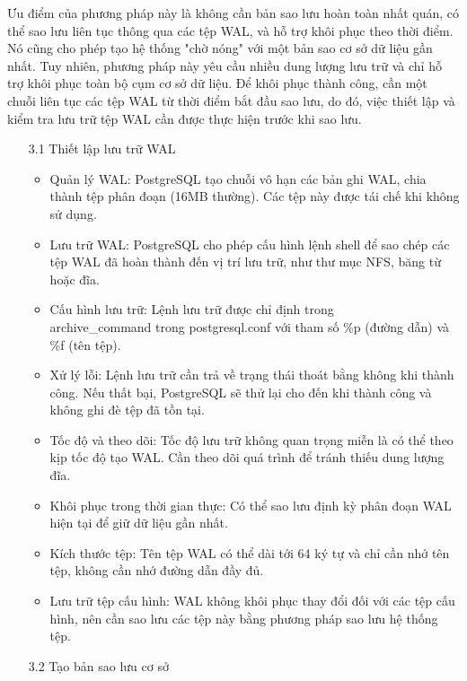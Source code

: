 \begin{enumerate}
    \hspace{1cm}Ưu điểm của phương pháp này là không cần bản sao lưu hoàn toàn nhất quán, có thể sao lưu liên tục thông qua các tệp WAL, và hỗ trợ khôi phục theo thời điểm. Nó cũng cho phép tạo hệ thống "chờ nóng" với một bản sao cơ sở dữ liệu gần nhất. Tuy nhiên, phương pháp này yêu cầu nhiều dung lượng lưu trữ và chỉ hỗ trợ khôi phục toàn bộ cụm cơ sở dữ liệu. Để khôi phục thành công, cần một chuỗi liên tục các tệp WAL từ thời điểm bắt đầu sao lưu, do đó, việc thiết lập và kiểm tra lưu trữ tệp WAL cần được thực hiện trước khi sao lưu.
    \begin{enumerate}
        \item[3.1] Thiết lập lưu trữ WAL
        \begin{itemize}
            \item Quản lý WAL: PostgreSQL tạo chuỗi vô hạn các bản ghi WAL, chia thành tệp phân đoạn (16MB thường). Các tệp này được tái chế khi không sử dụng.
            \item Lưu trữ WAL: PostgreSQL cho phép cấu hình lệnh shell để sao chép các tệp WAL đã hoàn thành đến vị trí lưu trữ, như thư mục NFS, băng từ hoặc đĩa.
            \item Cấu hình lưu trữ: Lệnh lưu trữ được chỉ định trong \\archive\_command trong postgresql.conf với tham số \%p (đường dẫn) và \%f (tên tệp).
            \item Xử lý lỗi: Lệnh lưu trữ cần trả về trạng thái thoát bằng không khi thành công. Nếu thất bại, PostgreSQL sẽ thử lại cho đến khi thành công và không ghi đè tệp đã tồn tại.
            \item Tốc độ và theo dõi: Tốc độ lưu trữ không quan trọng miễn là có thể theo kịp tốc độ tạo WAL. Cần theo dõi quá trình để tránh thiếu dung lượng đĩa.
            \item Khôi phục trong thời gian thực: Có thể sao lưu định kỳ phân đoạn WAL hiện tại để giữ dữ liệu gần nhất.
            \item Kích thước tệp: Tên tệp WAL có thể dài tới 64 ký tự và chỉ cần nhớ tên tệp, không cần nhớ đường dẫn đầy đủ.
            \item Lưu trữ tệp cấu hình: WAL không khôi phục thay đổi đối với các tệp cấu hình, nên cần sao lưu các tệp này bằng phương pháp sao lưu hệ thống tệp.
        \end{itemize}
        \item[3.2] Tạo bản sao lưu cơ sở
        

\end{enumerate}
\end{enumerate}
